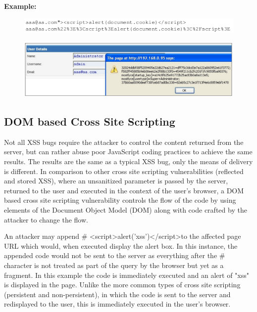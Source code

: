		{\bf Example: }

		\begin{figure}[H]
			\includegraphics[scale=0.5]{pics/link2.png}
		\end{figure}
		\begin{figure}[H]
			\includegraphics[scale=0.5]{pics/xss3.png}
		\end{figure}


	\subsection{DOM based Cross Site Scripting}
		Not all XSS bugs require the attacker to control the content returned from the server, but 
		can rather abuse poor JavaScript coding practices to achieve the same results. 
		The results are the same as a typical XSS bug, only the means of delivery is different.
		In comparison to other cross site scripting vulnerabilities (reflected and stored XSS), 
		where an unsanitized parameter is passed by the server, returned to the user and executed 
		in the context of the user’s browser, a DOM based cross site scripting vulnerability controls 
		the flow of the code by using elements of the Document Object Model (DOM) along with code 
		crafted by the attacker to change the flow.

		An attacker may append \# \textless script\textgreater alert('xss')\textless /script\textgreater to the affected page URL which would, 
		when executed display the alert box. In this instance, the appended code would not be sent 
		to the server as everything after the \# character is not treated as part of the query by 
		the browser but yet as a fragment. In this example the code is immediately executed and an
		alert of "xss" is displayed in the page. Unlike the more common types of cross site scripting 
		(persistent and non-persistent), in which the code is sent to the server and redisplayed to 
		the user, this is immediately executed in the user’s browser.


